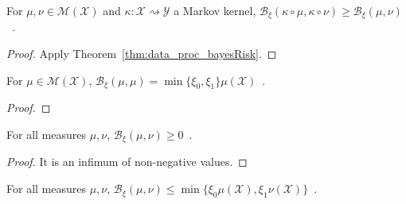 \begin{theorem}
  \label{thm:data_proc_bayesBinaryRisk}
  \leanok
  For $\mu, \nu \in \mathcal M(\mathcal X)$ and $\kappa : \mathcal X \rightsquigarrow \mathcal Y$ a Markov kernel, $\mathcal B_\xi(\kappa \circ \mu, \kappa \circ \nu) \ge \mathcal B_\xi(\mu, \nu)$~.
\end{theorem}

\begin{proof}\leanok
{}
Apply Theorem~\ref{thm:data_proc_bayesRisk}.
\end{proof}

\begin{lemma}
  \label{lem:bayesBinaryRisk_self}
  \leanok
  For $\mu \in \mathcal M(\mathcal X)$, $\mathcal B_\xi(\mu, \mu) = \min\{\xi_0, \xi_1\} \mu(\mathcal X)$~.
\end{lemma}

\begin{proof}\leanok
\uses{}
\end{proof}

\begin{lemma}
  \label{lem:bayesBinaryRisk_nonneg}
  For all measures $\mu, \nu$, $\mathcal B_\xi(\mu, \nu) \ge 0$~.
\end{lemma}

\begin{proof}%
\uses{}
It is an infimum of non-negative values.
\end{proof}

\begin{lemma}
  \label{lem:bayesBinaryRisk_le}
  \leanok
  For all measures $\mu, \nu$, $\mathcal B_\xi(\mu, \nu) \le \min\{\xi_0 \mu(\mathcal X), \xi_1 \nu(\mathcal X)\}$~.
\end{lemma}

